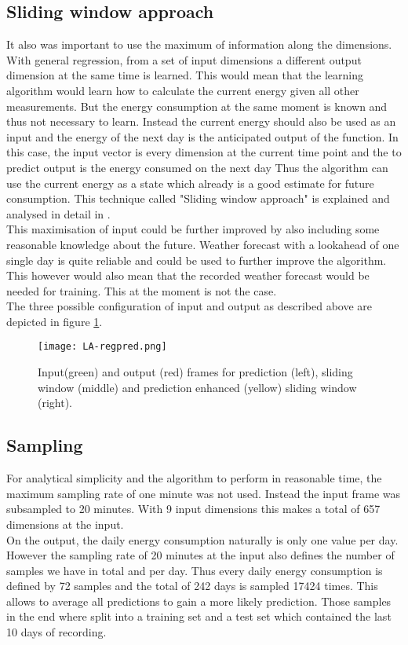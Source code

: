 \documentclass[conference]{IEEEtran}
\begin{document}
\subsection{Sliding window approach}
It also was important to use the maximum of information along the dimensions. With general regression, from a set of input dimensions a different output dimension at the same time is learned. This would mean that the learning algorithm would learn how to calculate the current energy given all other measurements. But the energy consumption at the same moment is known and thus not necessary to learn. Instead the current energy should also be used as an input and the energy of the next day is the anticipated output of the function. In this case, the input vector is every dimension at the current time point and the to predict output is the energy consumed on the next day Thus the algorithm can use the current energy as a state which already is a good estimate for future consumption. This technique called "Sliding window approach" is explained and analysed in detail in \cite{vafaeipour2014application}.\\
This maximisation of input could be further improved by also including some reasonable knowledge about the future. Weather forecast with a lookahead of one single day is quite reliable and could be used to further improve the algorithm. This however would also mean that the recorded weather forecast would be needed for training. This at the moment is not the case.\\
The three possible configuration of input and output as described above are depicted in figure \ref{fig:timeshift}.

\begin{figure}[!t] 
\centering 
\texttt{[image: LA-regpred.png]} 
\caption{Input(green) and output (red) frames for prediction (left), sliding window (middle) and prediction enhanced (yellow) sliding window (right).} 
\label{fig:timeshift} 
\end{figure}

\subsection{Sampling}
For analytical simplicity and the algorithm to perform in reasonable time, the maximum sampling rate of one minute was not used. Instead the input frame was subsampled to 20 minutes. With 9 input dimensions this makes a total of 657 dimensions at the input.\\
On the output, the daily energy consumption naturally is only one value per day. However the sampling rate of 20 minutes at the input also defines the number of samples we have in total and per day. Thus every daily energy consumption is defined by 72 samples and the total of 242 days is sampled 17424 times. This allows to average all predictions to gain a more likely prediction. Those samples in the end where split into a training set and a test set which contained the last 10 days of recording.
\end{document}
